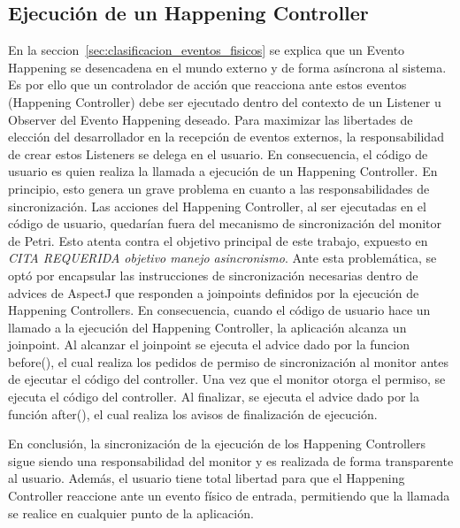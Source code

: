 \subsection{Ejecución de un Happening Controller}
En la seccion~\ref{sec:clasificacion_eventos_fisicos} se explica que un Evento
Happening se desencadena en el mundo externo y de forma asíncrona al sistema. Es
por ello que un controlador de acción que reacciona ante estos
eventos (Happening Controller) debe ser ejecutado dentro del contexto de un
Listener u Observer del Evento Happening deseado.
Para maximizar las libertades de elección del desarrollador en la recepción de
eventos externos, la responsabilidad de crear estos Listeners se delega en el
usuario. En consecuencia, el código de usuario es quien realiza la llamada a
ejecución de un Happening Controller.
En principio, esto genera un grave problema en cuanto a las responsabilidades
de sincronización.
Las acciones del Happening Controller, al ser ejecutadas en el código de
usuario, quedarían fuera del mecanismo de sincronización del monitor de Petri.
Esto atenta contra el objetivo principal de este trabajo, expuesto en \emph{\color{red} CITA REQUERIDA
objetivo manejo asincronismo}.
Ante esta problemática, se optó por encapsular las instrucciones de
sincronización necesarias dentro de advices de AspectJ que responden a
joinpoints definidos por la ejecución de Happening Controllers.
En consecuencia, cuando el código de usuario hace un llamado a la ejecución del
Happening Controller, la aplicación alcanza un joinpoint. Al alcanzar el
joinpoint se ejecuta el advice dado por la funcion before(), el cual realiza los
pedidos de permiso de sincronización al monitor antes de ejecutar el código del
controller. Una vez que el monitor otorga el permiso, se ejecuta el código del
controller. Al finalizar, se ejecuta el advice dado por la función after(), el
cual realiza los avisos de finalización de ejecución.

En conclusión, la sincronización de la ejecución de los Happening Controllers
sigue siendo una responsabilidad del monitor y es realizada de forma
transparente al usuario. Además, el usuario tiene total libertad para que el
Happening Controller reaccione ante un evento físico de entrada, permitiendo
que la llamada se realice en cualquier punto de la aplicación.





